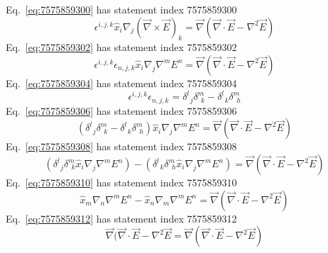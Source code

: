 \documentclass[12pt]{report}
\newcommand{\rowContravariantColumnCovariant}[3]{#1^{#2}_{\ \ #3}} %
\begin{document}
Eq.~\ref{eq:7575859300} has statement index 7575859300
\begin{equation}
\epsilon^{i,j,k} \hat{x}_i \nabla_j ( \vec{\nabla} \times \vec{E} )_k = \vec{\nabla}(\vec{\nabla} \cdot \vec{E} - \nabla^2 \vec{E})
\label{eq:7575859300}
\end{equation}
Eq.~\ref{eq:7575859302} has statement index 7575859302
\begin{equation}
\epsilon^{i,j,k} \epsilon_{n,j,k} \hat{x}_i \nabla_j \nabla^m E^n = \vec{\nabla}(\vec{\nabla} \cdot \vec{E} - \nabla^2 \vec{E})
\label{eq:7575859302}
\end{equation}
Eq.~\ref{eq:7575859304} has statement index 7575859304
\begin{equation}
\epsilon^{i,j,k} \epsilon_{n,j,k} = \rowContravariantColumnCovariant{\delta}{l}{j} \rowContravariantColumnCovariant{\delta}{m}{k} - \rowContravariantColumnCovariant{\delta}{l}{k} \rowContravariantColumnCovariant{\delta}{m}{h}
\label{eq:7575859304}
\end{equation}
Eq.~\ref{eq:7575859306} has statement index 7575859306
\begin{equation}
\left( \rowContravariantColumnCovariant{\delta}{l}{j} \rowContravariantColumnCovariant{\delta}{m}{k} - \rowContravariantColumnCovariant{\delta}{l}{k} \rowContravariantColumnCovariant{\delta}{m}{h} \right) \hat{x}_i \nabla_j \nabla^m E^n = \vec{\nabla}(\vec{\nabla} \cdot \vec{E} - \nabla^2 \vec{E})
\label{eq:7575859306}
\end{equation}
Eq.~\ref{eq:7575859308} has statement index 7575859308
\begin{equation}
\left( \rowContravariantColumnCovariant{\delta}{l}{j} \rowContravariantColumnCovariant{\delta}{m}{k} \hat{x}_i \nabla_j \nabla^m E^n\right)-\left( \rowContravariantColumnCovariant{\delta}{l}{k} \rowContravariantColumnCovariant{\delta}{m}{h} \hat{x}_i \nabla_j \nabla^m E^n \right)  = \vec{\nabla}(\vec{\nabla} \cdot \vec{E} - \nabla^2 \vec{E})
\label{eq:7575859308}
\end{equation}
Eq.~\ref{eq:7575859310} has statement index 7575859310
\begin{equation}
\hat{x}_m \nabla_n \nabla^m E^n - \hat{x}_n \nabla_m \nabla^m E^n = \vec{\nabla}(\vec{\nabla} \cdot \vec{E} - \nabla^2 \vec{E})
\label{eq:7575859310}
\end{equation}
Eq.~\ref{eq:7575859312} has statement index 7575859312
\begin{equation}
\vec{\nabla}(\vec{\nabla} \cdot \vec{E} - \nabla^2 \vec{E} = \vec{\nabla}(\vec{\nabla} \cdot \vec{E} - \nabla^2 \vec{E})
\label{eq:7575859312}
\end{equation}
\end{document}
